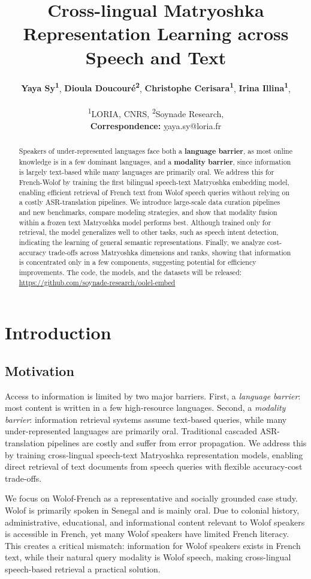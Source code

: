 \documentclass[11pt]{article}
\title{Cross-lingual Matryoshka Representation Learning across Speech and Text}
\author{
  \textbf{Yaya Sy\textsuperscript{1}},
  \textbf{Dioula Doucouré\textsuperscript{2}},
  \textbf{Christophe Cerisara\textsuperscript{1}},
  \textbf{Irina Illina\textsuperscript{1}},
\\
\\
  \textsuperscript{1}LORIA, CNRS,
  \textsuperscript{2}Soynade Research,
\\
  \small{
    \textbf{Correspondence:} \href{mailto:yaya.sy@loria@fr}yaya.sy@loria.fr
  }
}
\begin{document}
\maketitle
\begin{abstract}
Speakers of under-represented languages face both a \textbf{language barrier}, as most online knowledge is in a few dominant languages, and a \textbf{modality barrier}, since information is largely text-based while many languages are primarily oral. We address this for French-Wolof by training the first bilingual speech-text Matryoshka embedding model, enabling efficient retrieval of French text from Wolof speech queries without relying on a costly ASR-translation pipelines. We introduce large-scale data curation pipelines and new benchmarks, compare modeling strategies, and show that modality fusion within a frozen text Matryoshka model performs best. Although trained only for retrieval, the model generalizes well to other tasks, such as speech intent detection, indicating the learning of general semantic representations. Finally, we analyze cost-accuracy trade-offs across Matryoshka dimensions and ranks, showing that information is concentrated only in a few components, suggesting potential for efficiency improvements. The code, the models, and the datasets will be released: \url{https://github.com/soynade-research/oolel-embed}
\end{abstract}

\section{Introduction}
\subsection{Motivation}
Access to information is limited by two major barriers. First, a \textit{language barrier}: most content is written in a few high-resource languages. Second, a \textit{modality barrier}: information retrieval systems assume text-based queries, while many under-represented languages are primarily oral. Traditional cascaded ASR-translation pipelines are costly and suffer from error propagation. We address this by training cross-lingual speech-text Matryoshka representation models, enabling direct retrieval of text documents from speech queries with flexible accuracy-cost trade-offs.

We focus on Wolof-French as a representative and socially grounded case study. Wolof is primarily spoken in Senegal and is mainly oral. Due to colonial history, administrative, educational, and informational content relevant to Wolof speakers is accessible in French, yet many Wolof speakers have limited French literacy. This creates a critical mismatch: information for Wolof speakers exists in French text, while their natural query modality is Wolof speech, making cross-lingual speech-based retrieval a practical solution.
\end{document}
